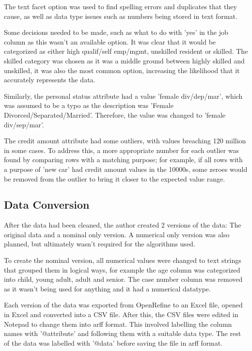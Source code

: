 \documentclass[runningheads, 12pt]{llncs}
\begin{document}
The text facet option was used to find spelling errors and duplicates that they cause, as well as data type issues such as numbers being stored in text format.

Some decisions needed to be made, such as what to do with 'yes' in the job column as this wasn't an available option. It was clear that it would be categorized as either high qualif/self emp/mgmt, unskilled resident or skilled. The skilled category was chosen as it was a middle ground between highly skilled and unskilled, it was also the most common option, increasing the likelihood that it accurately represents the data.

Similarly, the personal status attribute had a value 'female div/dep/mar', which was assumed to be a typo as the description was 'Female Divorced/Separated/Married'. Therefore, the value was changed to 'female div/sep/mar'.

The credit amount attribute had some outliers, with values breaching 120 million in some cases. To address this, a more appropriate number for each outlier was found by comparing rows with a matching purpose; for example, if all rows with a purpose of 'new car' had credit amount values in the 10000s, some zeroes would be removed from the outlier to bring it closer to the expected value range.

\subsection{Data Conversion}

After the data had been cleaned, the author created 2 versions of the data: The original data and a nominal only version. A numerical only version was also planned, but ultimately wasn't required for the algorithms used. 

To create the nominal version, all numerical values were changed to text strings that grouped them in logical ways, for example the age column was categorized into child, young adult, adult and senior. The case number column was removed as it wasn't being used for anything and it had a numerical datatype.

Each version of the data was exported from OpenRefine to an Excel file, opened in Excel and converted into a CSV file. After this, the CSV files were edited in Notepad to change them into arff format. This involved labelling the column names with '@attribute' and following them with a suitable data type. The rest of the data was labelled with '@data' before saving the file in arff format.
\end{document}
